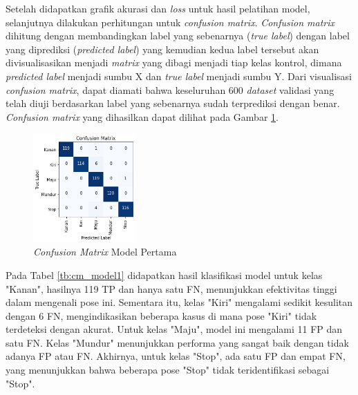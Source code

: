 Setelah didapatkan grafik akurasi dan \emph{loss} untuk hasil pelatihan model, selanjutnya dilakukan perhitungan untuk \emph{confusion matrix}. \emph{Confusion matrix} dihitung dengan membandingkan label yang sebenarnya (\emph{true label}) dengan label yang diprediksi (\emph{predicted label}) yang kemudian kedua label tersebut akan divisualisasikan menjadi \emph{matrix} yang dibagi menjadi tiap kelas kontrol, dimana \emph{predicted label} menjadi sumbu X dan \emph{true label} menjadi sumbu Y. Dari visualisasi \emph{confusion matrix}, dapat diamati bahwa keseluruhan 600 \emph{dataset} validasi yang telah diuji berdasarkan label yang sebenarnya sudah terprediksi dengan benar. \emph{Confusion matrix} yang dihasilkan dapat dilihat pada Gambar \ref{fig:matrix11}.

\begin{figure} [H] \centering
  \includegraphics[width=0.35\textwidth]{gambar/bab4/model5 (30cm)/110cm/matrix.png}
  \caption{\emph{Confusion Matrix} Model Pertama}
  \label{fig:matrix11}
\end{figure}

Pada Tabel \ref{tb:cm_model1} didapatkan hasil klasifikasi model untuk kelas "Kanan", hasilnya 119 TP dan hanya satu FN, menunjukkan efektivitas tinggi dalam mengenali pose ini. Sementara itu, kelas "Kiri" mengalami sedikit kesulitan dengan 6 FN, mengindikasikan beberapa kasus di mana pose "Kiri" tidak terdeteksi dengan akurat. Untuk kelas "Maju", model ini mengalami 11 FP dan satu FN. Kelas "Mundur" menunjukkan performa yang sangat baik dengan tidak adanya FP atau FN. Akhirnya, untuk kelas "Stop", ada satu FP dan empat FN, yang menunjukkan bahwa beberapa pose "Stop" tidak teridentifikasi sebagai "Stop".

